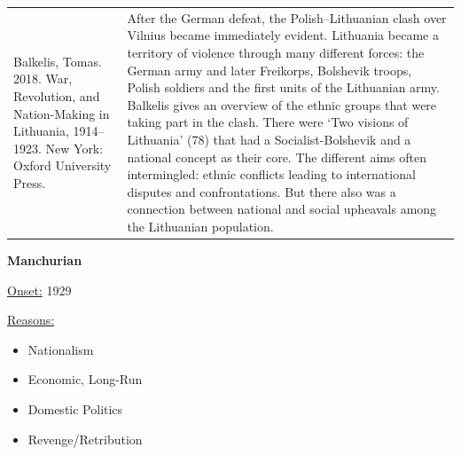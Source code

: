 {\begin{longtable}{p{}p{}}
\\
Balkelis, Tomas. 2018. War, Revolution, and Nation-Making in Lithuania, 1914–1923. New York: Oxford University Press. & After the German defeat, the Polish–Lithuanian clash over Vilnius became immediately evident. Lithuania became a territory of violence through many different forces: the German army and later Freikorps, Bolshevik troops, Polish soldiers and the first units of the Lithuanian army. Balkelis gives an overview of the ethnic groups that were taking part in the clash. There were ‘Two visions of Lithuania' (78) that had a Socialist-Bolshevik and a national concept as their core. The different aims often intermingled: ethnic conflicts leading to international disputes and confrontations. But there also was a connection between national and social upheavals among the Lithuanian population.
\\
\end{longtable}}
\clearpage
         \textbf{Manchurian} 

          \underline{Onset:} 1929         

\underline{Reasons:}
\begin{itemize}
\item Nationalism
\item Economic, Long-Run
\item Domestic Politics
\item Revenge/Retribution
\end{itemize}

